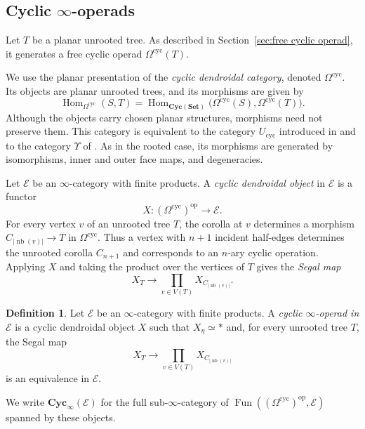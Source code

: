 \documentclass{amsart}
\newcommand{\Set}{\mathbf{Set}}
\newcommand{\Cyc}{\mathbf{Cyc}}
\newcommand{\Hom}{\operatorname{Hom}}
\theoremstyle{definition}
\newtheorem{definition}[theorem]{Definition}%
\numberwithin{equation}{section}
\begin{document}
\subsection{Cyclic \texorpdfstring{$\infty$}{infinity}-operads}
\label{subsec: cyclic infinity operad}

Let $T$ be a planar unrooted tree. As described in
Section~\ref{sec:free cyclic operad}, it generates a free cyclic
operad $\Omega^{\mathrm{cyc}}(T)$.

We use the planar presentation of the \emph{cyclic dendroidal
category}, denoted $\Omega^{\mathrm{cyc}}$. Its objects are planar
unrooted trees, and its morphisms are given by
\[
\Hom_{\Omega^{\mathrm{cyc}}}(S,T)
=
\Hom_{\Cyc(\Set)}
\bigl(
\Omega^{\mathrm{cyc}}(S),
\Omega^{\mathrm{cyc}}(T)
\bigr).
\]
Although the objects carry chosen planar structures, morphisms need
not preserve them. This category is equivalent to the category
$U_{\mathrm{cyc}}$ introduced in \cite{hry1} and to the category
$\Upsilon$ of \cite[Definition~4.8]{doherty2025models}. As in the
rooted case, its morphisms are generated by isomorphisms, inner and
outer face maps, and degeneracies.

Let $\mathcal E$ be an $\infty$-category with finite products. A
\emph{cyclic dendroidal object} in $\mathcal E$ is a functor
\[
X\colon
(\Omega^{\mathrm{cyc}})^{\mathrm{op}}
\longrightarrow
\mathcal E.
\]
For every vertex $v$ of an unrooted tree $T$, the corolla at $v$
determines a morphism
$C_{|\operatorname{nb}(v)|}\to T$ in
$\Omega^{\mathrm{cyc}}$. Thus a vertex with $n+1$ incident
half-edges determines the unrooted corolla $C_{n+1}$ and corresponds
to an $n$-ary cyclic operation. Applying $X$ and taking the product
over the vertices of $T$ gives the \emph{Segal map}
\[
X_T\longrightarrow
\prod_{v\in V(T)}
X_{C_{|\operatorname{nb}(v)|}}.
\]

\begin{definition}
\label{def: cyclic infinity operad}
Let $\mathcal E$ be an $\infty$-category with finite products. A
\emph{cyclic $\infty$-operad in $\mathcal E$} is a cyclic dendroidal
object $X$ such that $X_\eta\simeq *$ and, for every unrooted tree
$T$, the Segal map
\[
X_T\longrightarrow
\prod_{v\in V(T)}
X_{C_{|\operatorname{nb}(v)|}}
\]
is an equivalence in $\mathcal E$.

We write $\Cyc_\infty(\mathcal E)$ for the full
sub-$\infty$-category of
$\operatorname{Fun}((\Omega^{\mathrm{cyc}})^{\mathrm{op}},\mathcal E)$
spanned by these objects.
\end{definition}
\end{document}
